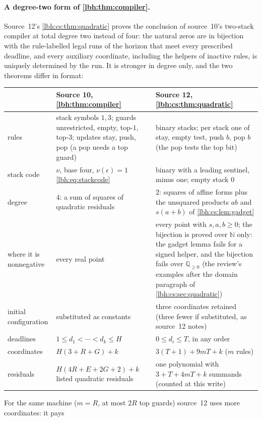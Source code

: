 \documentclass[11pt,letterpaper]{article}
\theoremstyle{definition}
\theoremstyle{remark}
\newcommand{\N}{\mathbb N}
\newcommand{\Q}{\mathbb Q}
\newcommand{\1}{\mathbf 1}
\begin{document}
\paragraph{A degree-two form of \cref{lbh:thm:compiler}.} Source~12's \cref{lbh:cs:thm:quadratic}
proves the conclusion of source~10's two-stack compiler at total degree two instead of four: the
natural zeros are in bijection with the rule-labelled legal runs of the horizon that meet every
prescribed deadline, and every auxiliary coordinate, including the helpers of inactive rules, is
uniquely determined by the run. It is stronger in degree only, and the two theorems differ in
format:
\begin{center}
\small
\begin{tabularx}{\textwidth}{@{}p{}XX@{}}
\toprule
 & Source 10, \cref{lbh:thm:compiler} & Source 12, \cref{lbh:cs:thm:quadratic}\\
\midrule
rules & stack symbols $1,3$; guards unrestricted, empty, top-$1$, top-$3$; updates stay, push,
pop (a pop needs a top guard) & binary stacks; per stack one of stay, empty test, push $b$,
pop $b$ (the pop tests the top bit)\\
stack code & $\nu$, base four, $\nu(\epsilon)=1$ \eqref{lbh:eq:stackcode} & binary with a leading
sentinel, minus one; empty stack $0$\\
degree & $4$: a sum of squares of quadratic residuals & $2$: squares of affine forms plus the
unsquared products $ab$ and $s(a+b)$ of \cref{lbh:cs:lem:gadget}\\
where it is nonnegative & every real point & every point with $s,a,b\ge0$; the bijection is proved
over $\N$ only: the gadget lemma fails for a signed helper, and the bijection fails over
$\Q_{\ge0}$ (the review's examples after the domain paragraph of \cref{lbh:cs:sec:quadratic})\\
initial configuration & substituted as constants & three coordinates retained (three fewer if
substituted, as source~12 notes)\\
deadlines & $1\le d_1<\cdots<d_k\le H$ & $0\le d_i\le T$, in any order\\
coordinates & $H(3+R+G)+k$ & $3(T+1)+9mT+k$ ($m$ rules)\\
residuals & $H(4R+E+2G+2)+k$ listed quadratic residuals & one polynomial with $3+T+4mT+k$ summands
(counted at this write)\\
\bottomrule
\end{tabularx}
\end{center}
For the same machine ($m=R$, at most $2R$ top guards) source~12 uses more coordinates: it pays
\end{document}
